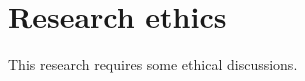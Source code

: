 \section{Research ethics}
\label{sec:Research ethics}
This research requires some ethical discussions.

\citet{alshurideh2021factors}

\citet{coghlan2020good}

\citet{bozkurt2020education}